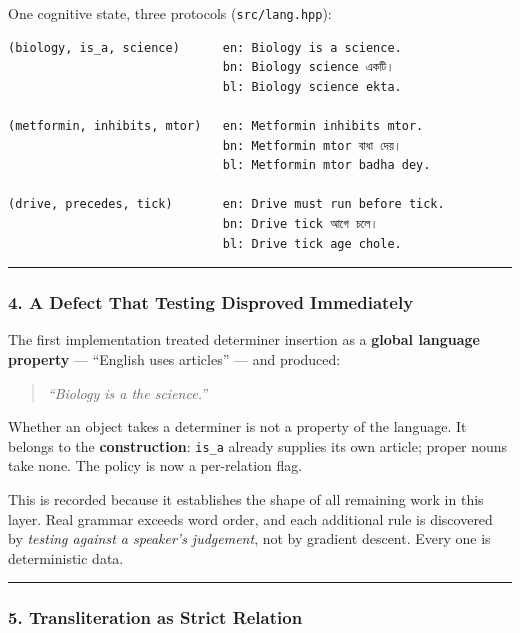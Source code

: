 \documentclass[
  11pt,
  a4paper,
]{article}
\begin{document}
One cognitive state, three protocols (\texttt{src/lang.hpp}):

\begin{verbatim}
(biology, is_a, science)      en: Biology is a science.
                              bn: Biology science একটি।
                              bl: Biology science ekta.

(metformin, inhibits, mtor)   en: Metformin inhibits mtor.
                              bn: Metformin mtor বাধা দেয়।
                              bl: Metformin mtor badha dey.

(drive, precedes, tick)       en: Drive must run before tick.
                              bn: Drive tick আগে চলে।
                              bl: Drive tick age chole.
\end{verbatim}

\begin{center}\rule{0.5\linewidth}{0.5pt}\end{center}

\subsubsection{4. A Defect That Testing Disproved
Immediately}\label{a-defect-that-testing-disproved-immediately}

The first implementation treated determiner insertion as a
\textbf{global language property} --- ``English uses articles'' --- and
produced:

\begin{quote}
\emph{``Biology is a the science.''}
\end{quote}

Whether an object takes a determiner is not a property of the language.
It belongs to the \textbf{construction}: \texttt{is\_a} already supplies
its own article; proper nouns take none. The policy is now a
per-relation flag.

This is recorded because it establishes the shape of all remaining work
in this layer. Real grammar exceeds word order, and each additional rule
is discovered by \emph{testing against a speaker's judgement}, not by
gradient descent. Every one is deterministic data.

\begin{center}\rule{0.5\linewidth}{0.5pt}\end{center}

\subsubsection{5. Transliteration as Strict
Relation}\label{transliteration-as-strict-relation}
\end{document}
